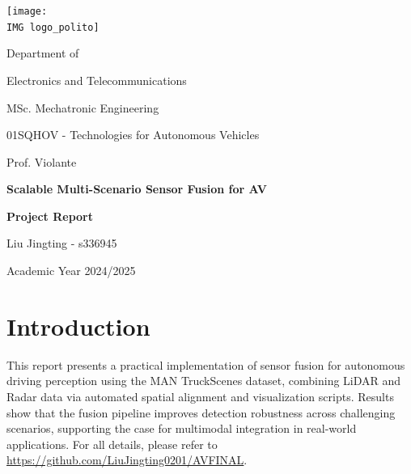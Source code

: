 \documentclass[10pt, a4paper, oneside]{article}
\newcommand{\IMG}{IMG/}
\begin{document}
	
	\thispagestyle{empty}
	
	\begin{titlepage}
		\begin{center}
			\texttt{[image: \\IMG logo\_polito]}
			
			\vspace{1cm}
			
			{\large Department of}
			
			\vspace{0.2cm}
			
			{\Large Electronics and Telecommunications}
			
			\vspace{0.2cm}
			
			{\large MSc. Mechatronic Engineering}
			
			\vfill
			
			{\large 01SQHOV - Technologies for Autonomous Vehicles}
			
			\vspace{0.2cm}
			
			{\large Prof. Violante}
			
			\vfill
			
			{\LARGE \textbf{Scalable Multi-Scenario Sensor Fusion for AV}}
			
			\vspace{0.2cm}
			
			{\large \textbf{Project Report}}
			\vspace{0.4cm}
			
			
			\vfill
			
			
			
			\vspace{0.2cm}
			
			
			Liu Jingting - s336945 
			
			\vfill
			
			{\large Academic Year 2024/2025}
		\end{center}
	\end{titlepage}
	
	\pagebreak
	
	

\section{Introduction}
This report presents a practical implementation of sensor fusion for autonomous driving perception using the MAN TruckScenes dataset, combining LiDAR and Radar data via automated spatial alignment and visualization scripts. Results show that the fusion pipeline improves detection robustness across challenging scenarios, supporting the case for multimodal integration in real-world applications.
For all details, please refer to \url{https://github.com/LiuJingting0201/AVFINAL}.
\end{document}
